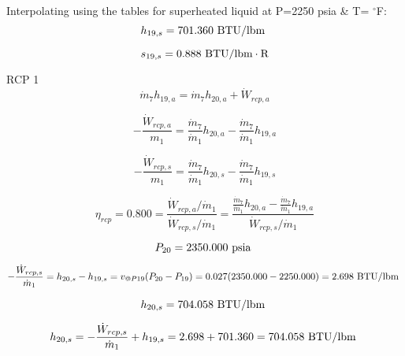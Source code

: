 \documentclass{article}
\begin{document}
Interpolating using the tables for superheated liquid at P=2250 psia \& T= \(^{\circ}\)F:
\begin{equation}
  h_{19,s} =  701.360\textnormal{ BTU/lbm                   }
\end{equation}

\begin{equation}
  s_{19,s} =    0.888\textnormal{ BTU/lbm}\cdot\textnormal{R}
\end{equation}


RCP 1
\begin{equation}
\dot{m}_{ 7}h_{19,a} = \dot{m}_{ 7}h_{20,a} + \dot{W}_{rcp,a}
\end{equation}

\begin{equation}
-\frac{\dot{W}_{rcp,a}}{m_1} = \frac{\dot{m}_{ 7}}{\dot{m}_{ 1}}h_{20,a} - \frac{\dot{m}_{ 7}}{\dot{m}_{ 1}}h_{19,a}\end{equation}

\begin{equation}
-\frac{\dot{W}_{rcp,s}}{m_1} = \frac{\dot{m}_{ 7}}{\dot{m}_{ 1}}h_{20,s} - \frac{\dot{m}_{ 7}}{\dot{m}_{ 1}}h_{19,s}\end{equation}

\begin{equation}
\eta_{rcp} =    0.800 = \frac{\dot{W}_{rcp,a} / \dot{m}_{1}}{\dot{W}_{rcp,s} / \dot{m}_{1}} = \frac{
\frac{\dot{m}_{ 7}}{\dot{m}_{ 1}}h_{20,a} - \frac{\dot{m}_{ 7}}{\dot{m}_{ 1}}h_{19,a}}{\dot{W}_{rcp,s} / \dot{m}_{1}}
\end{equation}

\begin{equation}
P_{20} = 2350.000\textnormal{ psia                      }
\end{equation}

\begin{equation}
-\frac{\dot{W}_{rcp,s}}{\dot{m}_{ 1}} = h_{20,s} - h_{19,s} = v_{@P19}(P_{20} - P_{19}) =    0.027(2350.000 - 2250.000) =    2.698\textnormal{ BTU/lbm                   }
\end{equation}

\begin{equation}
  h_{20,s} =  704.058\textnormal{ BTU/lbm                   }
\end{equation}

\begin{equation}
h_{20,s} = -\frac{\dot{W}_{rcp,s}}{\dot{m}_{1}} + h_{19,s} =    2.698 +  701.360 =  704.058\textnormal{ BTU/lbm                   }
\end{equation}
\end{document}
